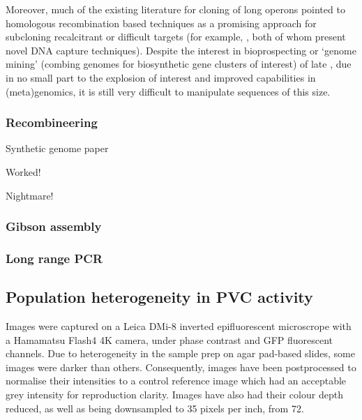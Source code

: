 Moreover, much of the existing literature for cloning of long operons pointed to homologous recombination based techniques as a promising approach for subcloning recalcitrant or difficult targets (for example, \cite{Wang2016, Garcia2004}, both of whom present novel DNA capture techniques). Despite the interest in bioprospecting or `genome mining' (combing genomes for biosynthetic gene clusters of interest) of late \citep{Ziemert2016, VanLanen2006, Netta2009, Lautru2005, Bergmann2007, Wenzel2009, Charlop-Powers2014}, due in no small part to the explosion of interest and improved capabilities in (meta)genomics, it is still very difficult to manipulate sequences of this size.

\subsubsection{Recombineering}
Synthetic genome paper


Worked!

Nightmare!


\subsubsection{Gibson assembly}

\subsubsection{Long range PCR}







\subsection{Population heterogeneity in PVC activity}



Images were captured on a Leica DMi-8 inverted epifluorescent microscrope with a Hamamatsu Flash4 4K camera, under phase contrast and GFP fluorescent channels. Due to heterogeneity in the sample prep on agar pad-based slides, some images were darker than others. Consequently, images have been postprocessed to normalise their intensities to a control reference image which had an acceptable grey intensity for reproduction clarity. Images have also had their colour depth reduced, as well as being downsampled to 35 pixels per inch, from 72.

